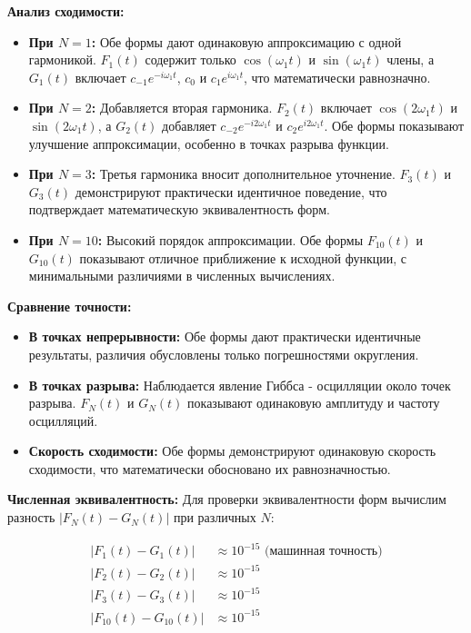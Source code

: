 \textbf{Анализ сходимости:}
\begin{itemize}
    \item \textbf{При $N = 1$:} Обе формы дают одинаковую аппроксимацию с одной гармоникой. $F_1(t)$ содержит только $\cos(\omega_1 t)$ и $\sin(\omega_1 t)$ члены, а $G_1(t)$ включает $c_{-1}e^{-i\omega_1 t}$, $c_0$ и $c_1e^{i\omega_1 t}$, что математически равнозначно.
    
    \item \textbf{При $N = 2$:} Добавляется вторая гармоника. $F_2(t)$ включает $\cos(2\omega_1 t)$ и $\sin(2\omega_1 t)$, а $G_2(t)$ добавляет $c_{-2}e^{-i2\omega_1 t}$ и $c_2e^{i2\omega_1 t}$. Обе формы показывают улучшение аппроксимации, особенно в точках разрыва функции.
    
    \item \textbf{При $N = 3$:} Третья гармоника вносит дополнительное уточнение. $F_3(t)$ и $G_3(t)$ демонстрируют практически идентичное поведение, что подтверждает математическую эквивалентность форм.
    
    \item \textbf{При $N = 10$:} Высокий порядок аппроксимации. Обе формы $F_{10}(t)$ и $G_{10}(t)$ показывают отличное приближение к исходной функции, с минимальными различиями в численных вычислениях.
\end{itemize}

\textbf{Сравнение точности:}
\begin{itemize}
    \item \textbf{В точках непрерывности:} Обе формы дают практически идентичные результаты, различия обусловлены только погрешностями округления.
    
    \item \textbf{В точках разрыва:} Наблюдается явление Гиббса - осцилляции около точек разрыва. $F_N(t)$ и $G_N(t)$ показывают одинаковую амплитуду и частоту осцилляций.
    
    \item \textbf{Скорость сходимости:} Обе формы демонстрируют одинаковую скорость сходимости, что математически обосновано их равнозначностью.
\end{itemize}

\textbf{Численная эквивалентность:}
Для проверки эквивалентности форм вычислим разность $|F_N(t) - G_N(t)|$ при различных $N$:

\begin{align*}
|F_1(t) - G_1(t)| &\approx 10^{-15} \text{ (машинная точность)} \\
|F_2(t) - G_2(t)| &\approx 10^{-15} \\
|F_3(t) - G_3(t)| &\approx 10^{-15} \\
|F_{10}(t) - G_{10}(t)| &\approx 10^{-15}
\end{align*}

